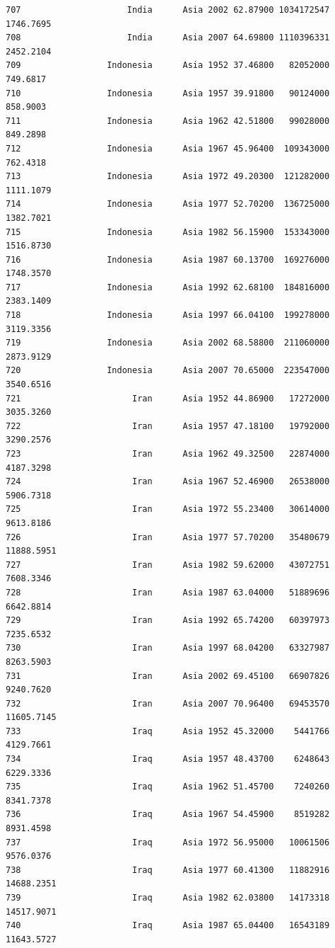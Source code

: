 \documentclass[
  letterpaper,
  DIV=11,
  numbers=noendperiod]{scrreprt}
\begin{document}
\begin{verbatim}
707                     India      Asia 2002 62.87900 1034172547   1746.7695
708                     India      Asia 2007 64.69800 1110396331   2452.2104
709                 Indonesia      Asia 1952 37.46800   82052000    749.6817
710                 Indonesia      Asia 1957 39.91800   90124000    858.9003
711                 Indonesia      Asia 1962 42.51800   99028000    849.2898
712                 Indonesia      Asia 1967 45.96400  109343000    762.4318
713                 Indonesia      Asia 1972 49.20300  121282000   1111.1079
714                 Indonesia      Asia 1977 52.70200  136725000   1382.7021
715                 Indonesia      Asia 1982 56.15900  153343000   1516.8730
716                 Indonesia      Asia 1987 60.13700  169276000   1748.3570
717                 Indonesia      Asia 1992 62.68100  184816000   2383.1409
718                 Indonesia      Asia 1997 66.04100  199278000   3119.3356
719                 Indonesia      Asia 2002 68.58800  211060000   2873.9129
720                 Indonesia      Asia 2007 70.65000  223547000   3540.6516
721                      Iran      Asia 1952 44.86900   17272000   3035.3260
722                      Iran      Asia 1957 47.18100   19792000   3290.2576
723                      Iran      Asia 1962 49.32500   22874000   4187.3298
724                      Iran      Asia 1967 52.46900   26538000   5906.7318
725                      Iran      Asia 1972 55.23400   30614000   9613.8186
726                      Iran      Asia 1977 57.70200   35480679  11888.5951
727                      Iran      Asia 1982 59.62000   43072751   7608.3346
728                      Iran      Asia 1987 63.04000   51889696   6642.8814
729                      Iran      Asia 1992 65.74200   60397973   7235.6532
730                      Iran      Asia 1997 68.04200   63327987   8263.5903
731                      Iran      Asia 2002 69.45100   66907826   9240.7620
732                      Iran      Asia 2007 70.96400   69453570  11605.7145
733                      Iraq      Asia 1952 45.32000    5441766   4129.7661
734                      Iraq      Asia 1957 48.43700    6248643   6229.3336
735                      Iraq      Asia 1962 51.45700    7240260   8341.7378
736                      Iraq      Asia 1967 54.45900    8519282   8931.4598
737                      Iraq      Asia 1972 56.95000   10061506   9576.0376
738                      Iraq      Asia 1977 60.41300   11882916  14688.2351
739                      Iraq      Asia 1982 62.03800   14173318  14517.9071
740                      Iraq      Asia 1987 65.04400   16543189  11643.5727

\end{verbatim}
\end{document}
